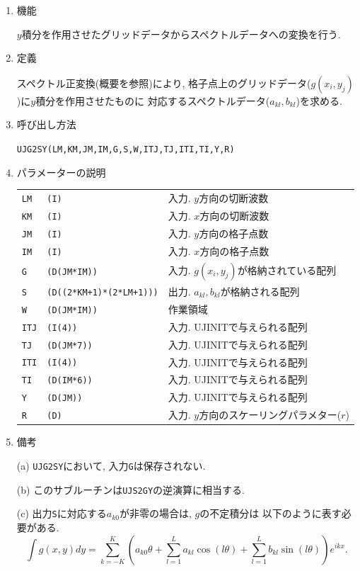 \documentclass[a4j,fleqn]{jarticle}
\begin{document}
\begin{enumerate}

\item 機能 

$y$積分を作用させたグリッドデータからスペクトルデータへの変換を行う.

\item 定義

スペクトル正変換(概要を参照)により, 
格子点上のグリッドデータ($g(x_i,y_j)$)に$y$積分を作用させたものに
対応するスペクトルデータ($a_{kl},b_{kl}$)を求める.

\item 呼び出し方法 

{\tt UJG2SY(LM,KM,JM,IM,G,S,W,ITJ,TJ,ITI,TI,Y,R)}
  
\item パラメーターの説明

\begin{tabular}{lll}
{\tt LM} & {\tt (I)} & 入力. $y$方向の切断波数\\
{\tt KM} & {\tt (I)} & 入力. $x$方向の切断波数\\
{\tt JM} & {\tt (I)} & 入力. $y$方向の格子点数\\
{\tt IM} & {\tt (I)} & 入力. $x$方向の格子点数\\
{\tt G} & {\tt (D(JM*IM))} & 入力. $g(x_i,y_j)$が格納されている配列\\
{\tt S} & {\tt (D((2*KM+1)*(2*LM+1)))} & 出力. $a_{kl},b_{kl}$が格納される配列\\
{\tt W} & {\tt (D(JM*IM))} & 作業領域\\
{\tt ITJ} & {\tt (I(4))} & 入力. UJINITで与えられる配列\\
{\tt TJ} & {\tt (D(JM*7))} & 入力. UJINITで与えられる配列\\
{\tt ITI} & {\tt (I(4))} & 入力. UJINITで与えられる配列\\
{\tt TI} & {\tt (D(IM*6))} & 入力. UJINITで与えられる配列\\
{\tt Y} & {\tt (D(JM))} & 入力. UJINITで与えられる配列\\
{\tt R} & {\tt (D)} & 入力. $y$方向のスケーリングパラメター($r$)
\end{tabular}

\item 備考

(a) {\tt UJG2SY}において, 入力{\tt G}は保存されない.

(b) このサブルーチンは{\tt UJS2GY}の逆演算に相当する.

(c) 出力{\tt S}に対応する$a_{k0}$が非零の場合は, $g$の不定積分は
 以下のように表す必要がある.
\[
\int g(x,y) dy=\sum^K_{k=-K}\left(
a_{k0}\theta+\sum^L_{l=1}a_{kl}\cos(l\theta)
+\sum^L_{l=1}b_{kl}\sin(l\theta)\right)
e^{ikx}.
\]

\end{enumerate}
\end{document}
